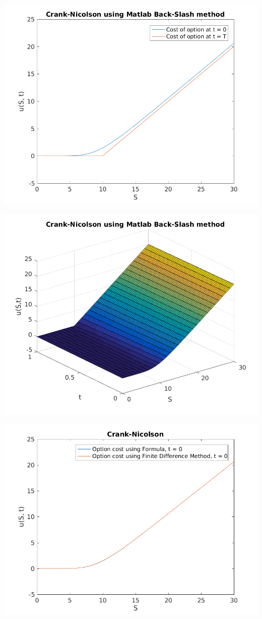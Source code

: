 \documentclass{article}
\begin{document}
\includegraphics{"q1_21"}
\pagebreak


\includegraphics{"q1_22"}
\pagebreak


\includegraphics{"q1_23"}
\pagebreak
\end{document}
